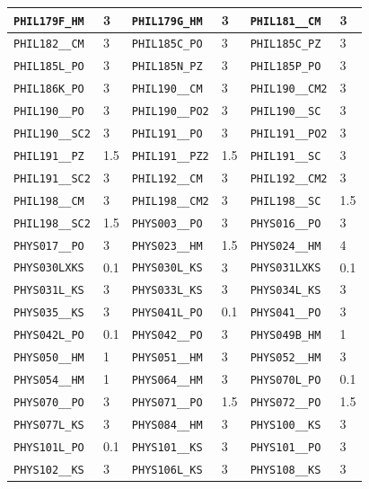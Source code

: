 \begin{longtable}{|l|l||l|l||l|l|}
    \verb|PHIL179F_HM| & 3 & \verb|PHIL179G_HM| & 3 & \verb|PHIL181__CM| & 3\\\hline
    \verb|PHIL182__CM| & 3 & \verb|PHIL185C_PO| & 3 & \verb|PHIL185C_PZ| & 3\\\hline
    \verb|PHIL185L_PO| & 3 & \verb|PHIL185N_PZ| & 3 & \verb|PHIL185P_PO| & 3\\\hline
    \verb|PHIL186K_PO| & 3 & \verb|PHIL190__CM| & 3 & \verb|PHIL190__CM2| & 3\\\hline
    \verb|PHIL190__PO| & 3 & \verb|PHIL190__PO2| & 3 & \verb|PHIL190__SC| & 3\\\hline
    \verb|PHIL190__SC2| & 3 & \verb|PHIL191__PO| & 3 & \verb|PHIL191__PO2| & 3\\\hline
    \verb|PHIL191__PZ| & 1.5 & \verb|PHIL191__PZ2| & 1.5 & \verb|PHIL191__SC| & 3\\\hline
    \verb|PHIL191__SC2| & 3 & \verb|PHIL192__CM| & 3 & \verb|PHIL192__CM2| & 3\\\hline
    \verb|PHIL198__CM| & 3 & \verb|PHIL198__CM2| & 3 & \verb|PHIL198__SC| & 1.5\\\hline
    \verb|PHIL198__SC2| & 1.5 & \verb|PHYS003__PO| & 3 & \verb|PHYS016__PO| & 3\\\hline
    \verb|PHYS017__PO| & 3 & \verb|PHYS023__HM| & 1.5 & \verb|PHYS024__HM| & 4\\\hline
    \verb|PHYS030LXKS| & 0.1 & \verb|PHYS030L_KS| & 3 & \verb|PHYS031LXKS| & 0.1\\\hline
    \verb|PHYS031L_KS| & 3 & \verb|PHYS033L_KS| & 3 & \verb|PHYS034L_KS| & 3\\\hline
    \verb|PHYS035__KS| & 3 & \verb|PHYS041L_PO| & 0.1 & \verb|PHYS041__PO| & 3\\\hline
    \verb|PHYS042L_PO| & 0.1 & \verb|PHYS042__PO| & 3 & \verb|PHYS049B_HM| & 1\\\hline
    \verb|PHYS050__HM| & 1 & \verb|PHYS051__HM| & 3 & \verb|PHYS052__HM| & 3\\\hline
    \verb|PHYS054__HM| & 1 & \verb|PHYS064__HM| & 3 & \verb|PHYS070L_PO| & 0.1\\\hline
    \verb|PHYS070__PO| & 3 & \verb|PHYS071__PO| & 1.5 & \verb|PHYS072__PO| & 1.5\\\hline
    \verb|PHYS077L_KS| & 3 & \verb|PHYS084__HM| & 3 & \verb|PHYS100__KS| & 3\\\hline
    \verb|PHYS101L_PO| & 0.1 & \verb|PHYS101__KS| & 3 & \verb|PHYS101__PO| & 3\\\hline
    \verb|PHYS102__KS| & 3 & \verb|PHYS106L_KS| & 3 & \verb|PHYS108__KS| & 3\\\hline

\end{longtable}
